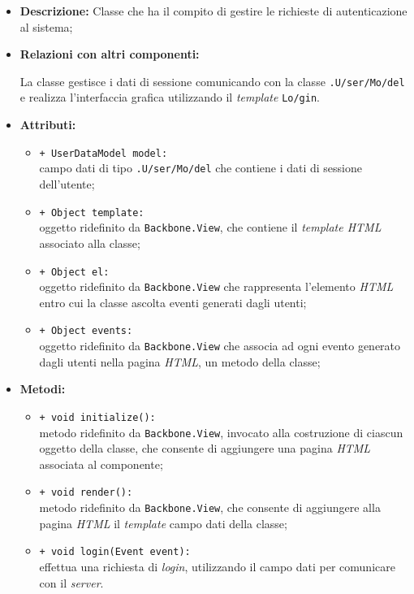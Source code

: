 \begin{flushleft}
\begin{itemize}
\item \textbf{Descrizione:} Classe che ha il compito di gestire le richieste di autenticazione al sistema;
\item \textbf{Relazioni con altri componenti:}
\begin{sloppypar}
La classe gestisce i dati di sessione comunicando con la classe \texttt{\model{}.U\fshyp{}ser\fshyp{}Mo\fshyp{}del} e realizza l'interfaccia grafica utilizzando il \textit{template} \texttt{\view{}Lo\fshyp{}gin}.
\end{sloppypar}
\item \textbf{Attributi:}
\begin{sloppypar}
\begin{itemize}
\item \texttt{+ UserDataModel model:}\\ campo dati di tipo \texttt{\model{}.U\fshyp{}ser\fshyp{}Mo\fshyp{}del} che contiene i dati di sessione dell'utente;
\item \texttt{+ Object template:}\\ oggetto ridefinito da \texttt{Backbone.View}, che contiene il \textit{template HTML} associato alla classe;
\item \texttt{+ Object el:}\\ oggetto ridefinito da \texttt{Backbone.View} che rappresenta l'elemento \textit{HTML} entro cui la classe ascolta eventi generati dagli utenti;
\item \texttt{+ Object events:}\\ oggetto ridefinito da \texttt{Backbone.View} che associa ad ogni evento generato dagli utenti nella pagina \textit{HTML}, un metodo della classe;
\end{itemize}
\end{sloppypar}
\item \textbf{Metodi:}
\begin{sloppypar}
\begin{itemize}
\item \texttt{+ void initialize():}\\ metodo ridefinito da \texttt{Backbone.View}, invocato alla costruzione di ciascun oggetto della classe, che consente di aggiungere una pagina \textit{HTML} associata al componente;
\item \texttt{+ void render():}\\ metodo ridefinito da \texttt{Backbone.View}, che consente di aggiungere alla pagina \textit{HTML} il \textit{template} campo dati della classe;
\item \texttt{+ void login(Event event):}\\ effettua una richiesta di \textit{login}, utilizzando il campo dati \model{} per comunicare con il \textit{server}.
\end{itemize}
\end{sloppypar}
\end{itemize}
\end{flushleft}

